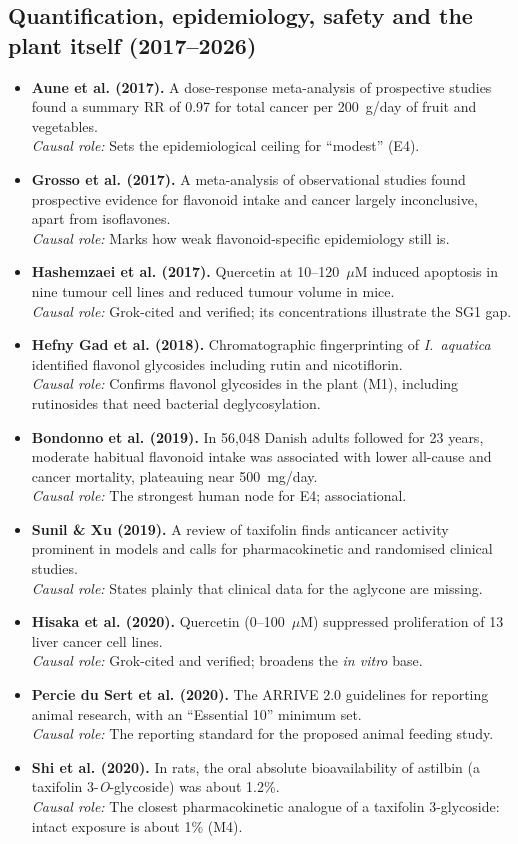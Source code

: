 \documentclass[11pt,a4paper]{article}
\newenvironment{litlist}{\begin{itemize}[leftmargin=2.6em,labelwidth=2.2em,labelsep=0.4em,align=left,itemsep=5pt,topsep=4pt]}{\end{itemize}}
\newcommand{\litentry}[4]{\item[\cite{#1}] \textbf{\color{navy}#2.} #3\\[1pt]
  {\color{teal}\textit{Causal role:}} #4}
\newcommand{\Ia}{\emph{I.~aquatica}}
\begin{document}
\subsection{Quantification, epidemiology, safety and the plant itself (2017--2026)}
\begin{litlist}
\litentry{aune2017}{Aune et al. (2017)}{A dose-response meta-analysis of prospective studies found a summary RR of 0.97 for total cancer per 200~g/day of fruit and vegetables.}{Sets the epidemiological ceiling for ``modest'' (E4).}

\litentry{grosso2017}{Grosso et al. (2017)}{A meta-analysis of observational studies found prospective evidence for flavonoid intake and cancer largely inconclusive, apart from isoflavones.}{Marks how weak flavonoid-specific epidemiology still is.}

\litentry{hashemzaei2017}{Hashemzaei et al. (2017)}{Quercetin at 10--120~$\mu$M induced apoptosis in nine tumour cell lines and reduced tumour volume in mice.}{Grok-cited and verified; its concentrations illustrate the SG1 gap.}

\litentry{hefnygad2018}{Hefny Gad et al. (2018)}{Chromatographic fingerprinting of \Ia{} identified flavonol glycosides including rutin and nicotiflorin.}{Confirms flavonol glycosides in the plant (M1), including rutinosides that need bacterial deglycosylation.}

\litentry{bondonno2019}{Bondonno et al. (2019)}{In 56{,}048 Danish adults followed for 23 years, moderate habitual flavonoid intake was associated with lower all-cause and cancer mortality, plateauing near 500~mg/day.}{The strongest human node for E4; associational.}

\litentry{sunil2019}{Sunil \& Xu (2019)}{A review of taxifolin finds anticancer activity prominent in models and calls for pharmacokinetic and randomised clinical studies.}{States plainly that clinical data for the aglycone are missing.}

\litentry{hisaka2020}{Hisaka et al. (2020)}{Quercetin (0--100~$\mu$M) suppressed proliferation of 13 liver cancer cell lines.}{Grok-cited and verified; broadens the \emph{in vitro} base.}

\litentry{perciedusert2020}{Percie du Sert et al. (2020)}{The ARRIVE 2.0 guidelines for reporting animal research, with an ``Essential 10'' minimum set.}{The reporting standard for the proposed animal feeding study.}

\litentry{shi2020}{Shi et al. (2020)}{In rats, the oral absolute bioavailability of astilbin (a taxifolin 3-\emph{O}-glycoside) was about 1.2\%.}{The closest pharmacokinetic analogue of a taxifolin 3-glycoside: intact exposure is about 1\% (M4).}


\end{litlist}
\end{document}
